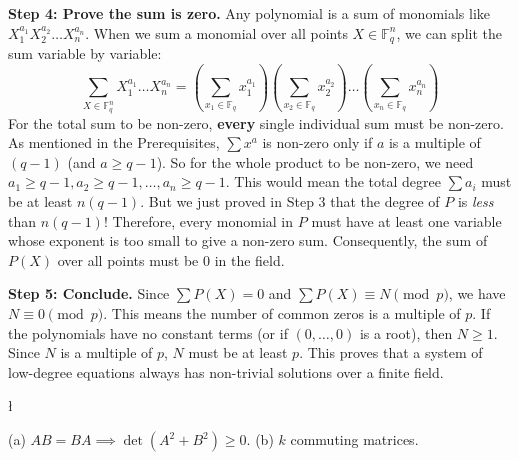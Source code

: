 \begin{solution}
\textbf{Step 4: Prove the sum is zero.}
Any polynomial is a sum of monomials like $X_1^{a_1} X_2^{a_2} \dots X_n^{a_n}$.
When we sum a monomial over all points $X \in \mathbb{F}_q^n$, we can split the sum variable by variable:
\[ \sum_{X \in \mathbb{F}_q^n} X_1^{a_1} \dots X_n^{a_n} = \left( \sum_{x_1 \in \mathbb{F}_q} x_1^{a_1} \right) \left( \sum_{x_2 \in \mathbb{F}_q} x_2^{a_2} \right) \dots \left( \sum_{x_n \in \mathbb{F}_q} x_n^{a_n} \right) \]
For the total sum to be non-zero, \textbf{every} single individual sum must be non-zero.
As mentioned in the Prerequisites, $\sum x^a$ is non-zero only if $a$ is a multiple of $(q-1)$ (and $a \geq q-1$).
So for the whole product to be non-zero, we need $a_1 \geq q-1, a_2 \geq q-1, \dots, a_n \geq q-1$.
This would mean the total degree $\sum a_i$ must be at least $n(q-1)$.
But we just proved in Step 3 that the degree of $P$ is \textit{less} than $n(q-1)$!
Therefore, every monomial in $P$ must have at least one variable whose exponent is too small to give a non-zero sum.
Consequently, the sum of $P(X)$ over all points must be $0$ in the field.

\textbf{Step 5: Conclude.}
Since $\sum P(X) = 0$ and $\sum P(X) \equiv N \pmod p$, we have $N \equiv 0 \pmod p$.
This means the number of common zeros is a multiple of $p$.
If the polynomials have no constant terms (or if $(0, \dots, 0)$ is a root), then $N \geq 1$. Since $N$ is a multiple of $p$, $N$ must be at least $p$. This proves that a system of low-degree equations always has non-trivial solutions over a finite field.
\end{solution}

\begin{exercise}
\l\label{2014:6}

\label{algebra:2014:6}(a) $AB=BA \implies \det(A^2+B^2) \geq 0$. (b) $k$ commuting matrices.
\end{exercise}

